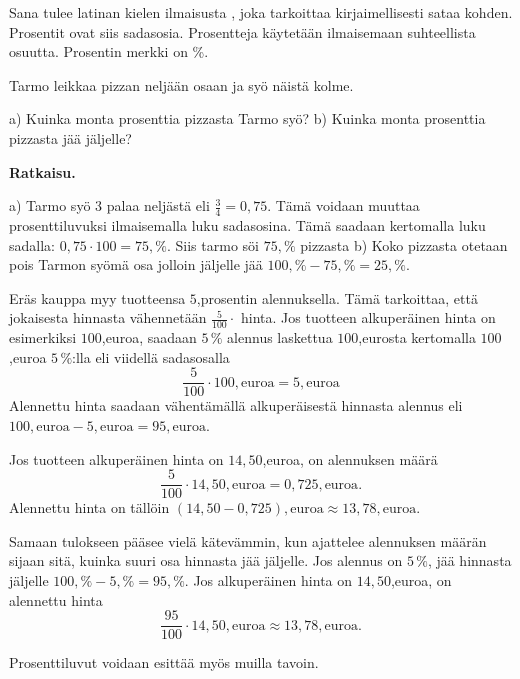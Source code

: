 Sana  tulee latinan kielen ilmaisusta ,
joka tarkoittaa kirjaimellisesti sataa kohden. 
Prosentit ovat siis sadasosia.
Prosentteja käytetään ilmaisemaan suhteellista osuutta.
Prosentin merkki on \%.


\begin{esimerkki}
Tarmo leikkaa pizzan neljään osaan ja syö näistä kolme.

a) Kuinka monta prosenttia pizzasta Tarmo syö?
\newline b) Kuinka monta prosenttia pizzasta jää jäljelle?

\textbf{Ratkaisu.}

a) Tarmo syö 3 palaa neljästä eli $\frac{3}{4} = 0,75$. Tämä voidaan muuttaa prosenttiluvuksi ilmaisemalla luku sadasosina. Tämä saadaan kertomalla luku sadalla: $0,75 \cdot 100 = 75,\%$. Siis tarmo söi $75,\%$ pizzasta
\newline b) Koko pizzasta otetaan pois Tarmon syömä osa jolloin jäljelle jää $100,\% - 75,\% = 25,\%$.
\end{esimerkki}


\begin{esimerkki}
Eräs kauppa myy tuotteensa $5$,prosentin alennuksella. Tämä tarkoittaa, että jokaisesta hinnasta vähennetään $\frac{5}{100} \cdot$ hinta. Jos tuotteen alkuperäinen hinta on esimerkiksi $100$,euroa, saadaan $5\,\%$ alennus laskettua $100$,eurosta kertomalla $100$,euroa $5\,\%$:lla eli viidellä sadasosalla 
\[
\frac{5}{100} \cdot 100,\text{euroa} = 5,\text{euroa}
\]
Alennettu hinta saadaan vähentämällä alkuperäisestä hinnasta alennus eli $100,\text{euroa} - 5,\text{euroa} = 95,\text{euroa}$.

Jos tuotteen alkuperäinen hinta on $14,50$,euroa, on alennuksen määrä
\[
	\frac{5}{100} \cdot 14,50,\text{euroa} = 0,725,\text{euroa}.
\]
Alennettu hinta on tällöin $(14,50 - 0,725),\text{euroa} \approx 13,78,\text{euroa}$.

Samaan tulokseen pääsee vielä kätevämmin, kun ajattelee alennuksen määrän sijaan sitä, kuinka suuri osa hinnasta jää jäljelle. Jos alennus on $5\,\%$, jää hinnasta jäljelle $100,\% - 5,\% = 95,\%$. Jos alkuperäinen hinta on $14,50$,euroa, on alennettu hinta 
\[
	\frac{95}{100} \cdot 14,50,\text{euroa} \approx 13,78,\text{euroa}.
\]
\end{esimerkki}

\begin{esimerkki}
    Prosenttiluvut voidaan esittää myös muilla tavoin.
    \begin{alakohdat}
    \end{alakohdat}
\end{esimerkki}


